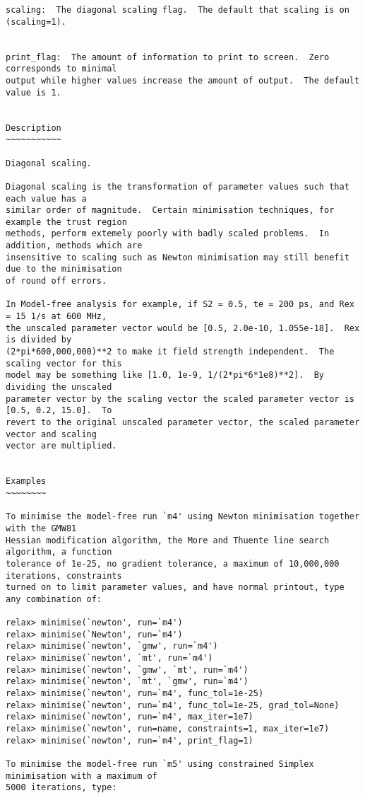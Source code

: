{\begin{verbatim}
scaling:  The diagonal scaling flag.  The default that scaling is on (scaling=1).


print_flag:  The amount of information to print to screen.  Zero corresponds to minimal
output while higher values increase the amount of output.  The default value is 1.


Description
~~~~~~~~~~~

Diagonal scaling.

Diagonal scaling is the transformation of parameter values such that each value has a
similar order of magnitude.  Certain minimisation techniques, for example the trust region
methods, perform extemely poorly with badly scaled problems.  In addition, methods which are
insensitive to scaling such as Newton minimisation may still benefit due to the minimisation
of round off errors.

In Model-free analysis for example, if S2 = 0.5, te = 200 ps, and Rex = 15 1/s at 600 MHz,
the unscaled parameter vector would be [0.5, 2.0e-10, 1.055e-18].  Rex is divided by
(2*pi*600,000,000)**2 to make it field strength independent.  The scaling vector for this
model may be something like [1.0, 1e-9, 1/(2*pi*6*1e8)**2].  By dividing the unscaled
parameter vector by the scaling vector the scaled parameter vector is [0.5, 0.2, 15.0].  To
revert to the original unscaled parameter vector, the scaled parameter vector and scaling
vector are multiplied.


Examples
~~~~~~~~

To minimise the model-free run `m4' using Newton minimisation together with the GMW81
Hessian modification algorithm, the More and Thuente line search algorithm, a function
tolerance of 1e-25, no gradient tolerance, a maximum of 10,000,000 iterations, constraints
turned on to limit parameter values, and have normal printout, type any combination of:

relax> minimise(`newton', run=`m4')
relax> minimise(`Newton', run=`m4')
relax> minimise(`newton', `gmw', run=`m4')
relax> minimise(`newton', `mt', run=`m4')
relax> minimise(`newton', `gmw', `mt', run=`m4')
relax> minimise(`newton', `mt', `gmw', run=`m4')
relax> minimise(`newton', run=`m4', func_tol=1e-25)
relax> minimise(`newton', run=`m4', func_tol=1e-25, grad_tol=None)
relax> minimise(`newton', run=`m4', max_iter=1e7)
relax> minimise(`newton', run=name, constraints=1, max_iter=1e7)
relax> minimise(`newton', run=`m4', print_flag=1)

To minimise the model-free run `m5' using constrained Simplex minimisation with a maximum of
5000 iterations, type:


\end{verbatim}}
